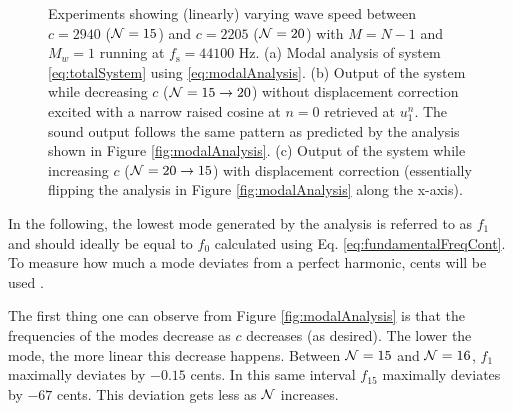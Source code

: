 \begin{figure}[ht!]
    \vspace{-1em}\caption{Experiments showing (linearly) varying wave speed between $c = 2940$ ($\mathcal{N} = 15$) and $c = 2205$ ($\mathcal{N} = 20$) with $M = N -1$ and $M_w = 1$ running at $f_\text{s} = 44100$ Hz. (a) Modal analysis of system \eqref{eq:totalSystem} using \eqref{eq:modalAnalysis}. (b) Output of the system while decreasing $c$ ($\mathcal{N} = 15 \rightarrow 20$) without displacement correction excited with a narrow raised cosine at $n=0$ retrieved at $u_1^n$. The sound output follows the same pattern as predicted by the analysis shown in Figure \ref{fig:modalAnalysis}. (c) Output of the system while increasing $c$ ($\mathcal{N} = 20 \rightarrow 15$) with displacement correction (essentially flipping the analysis in Figure \ref{fig:modalAnalysis} along the x-axis). \label{fig:analysisAndSpecs}}
\end{figure}
In the following, %
the lowest mode generated by the analysis is referred to as $f_1$ and should ideally be equal to $f_0$ calculated using Eq. \eqref{eq:fundamentalFreqCont}. To measure how much a mode deviates from a perfect harmonic, cents will be used .

The first thing one can observe from Figure \ref{fig:modalAnalysis} is that the frequencies of the modes decrease as $c$ decreases (as desired). The lower the mode, the more linear this decrease happens. Between $\mathcal{N} = 15$ and $\mathcal{N} = 16$, $f_1$ maximally deviates by $-0.15$ cents. In this same interval $f_{15}$ maximally deviates by $-67$ cents. This deviation %
gets %
less as $\mathcal{N}$ increases. %


